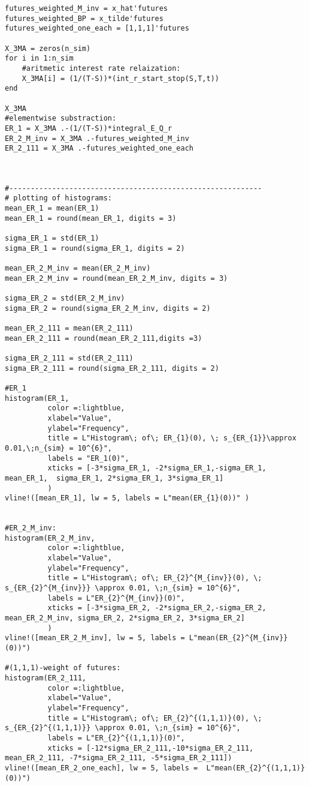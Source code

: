 \begin{verbatim}
futures_weighted_M_inv = x_hat'futures
futures_weighted_BP = x_tilde'futures
futures_weighted_one_each = [1,1,1]'futures

X_3MA = zeros(n_sim)
for i in 1:n_sim
    #aritmetic interest rate relaization:
    X_3MA[i] = (1/(T-S))*(int_r_start_stop(S,T,t))
end

X_3MA
#elementwise substraction:
ER_1 = X_3MA .-(1/(T-S))*integral_E_Q_r
ER_2_M_inv = X_3MA .-futures_weighted_M_inv
ER_2_111 = X_3MA .-futures_weighted_one_each



#-----------------------------------------------------------
# plotting of histograms: 
mean_ER_1 = mean(ER_1)
mean_ER_1 = round(mean_ER_1, digits = 3)

sigma_ER_1 = std(ER_1) 
sigma_ER_1 = round(sigma_ER_1, digits = 2)

mean_ER_2_M_inv = mean(ER_2_M_inv)
mean_ER_2_M_inv = round(mean_ER_2_M_inv, digits = 3)

sigma_ER_2 = std(ER_2_M_inv)
sigma_ER_2 = round(sigma_ER_2_M_inv, digits = 2)

mean_ER_2_111 = mean(ER_2_111)
mean_ER_2_111 = round(mean_ER_2_111,digits =3)

sigma_ER_2_111 = std(ER_2_111)
sigma_ER_2_111 = round(sigma_ER_2_111, digits = 2)

#ER_1
histogram(ER_1, 
          color =:lightblue, 
          xlabel="Value", 
          ylabel="Frequency", 
          title = L"Histogram\; of\; ER_{1}(0), \; s_{ER_{1}}\approx 0.01,\;n_{sim} = 10^{6}", 
          labels = "ER_1(0)", 
          xticks = [-3*sigma_ER_1, -2*sigma_ER_1,-sigma_ER_1, mean_ER_1,  sigma_ER_1, 2*sigma_ER_1, 3*sigma_ER_1]
          )
vline!([mean_ER_1], lw = 5, labels = L"mean(ER_{1}(0))" )


#ER_2_M_inv:
histogram(ER_2_M_inv, 
          color =:lightblue, 
          xlabel="Value", 
          ylabel="Frequency", 
          title = L"Histogram\; of\; ER_{2}^{M_{inv}}(0), \; s_{ER_{2}^{M_{inv}}} \approx 0.01, \;n_{sim} = 10^{6}", 
          labels = L"ER_{2}^{M_{inv}}(0)", 
          xticks = [-3*sigma_ER_2, -2*sigma_ER_2,-sigma_ER_2, mean_ER_2_M_inv, sigma_ER_2, 2*sigma_ER_2, 3*sigma_ER_2]
          )
vline!([mean_ER_2_M_inv], lw = 5, labels = L"mean(ER_{2}^{M_{inv}}(0))")

#(1,1,1)-weight of futures:
histogram(ER_2_111, 
          color =:lightblue, 
          xlabel="Value", 
          ylabel="Frequency", 
          title = L"Histogram\; of\; ER_{2}^{(1,1,1)}(0), \; s_{ER_{2}^{(1,1,1)}} \approx 0.01, \;n_{sim} = 10^{6}", 
          labels = L"ER_{2}^{(1,1,1)}(0)", 
          xticks = [-12*sigma_ER_2_111,-10*sigma_ER_2_111, mean_ER_2_111, -7*sigma_ER_2_111, -5*sigma_ER_2_111])
vline!([mean_ER_2_one_each], lw = 5, labels =  L"mean(ER_{2}^{(1,1,1)}(0))")
\end{verbatim}

